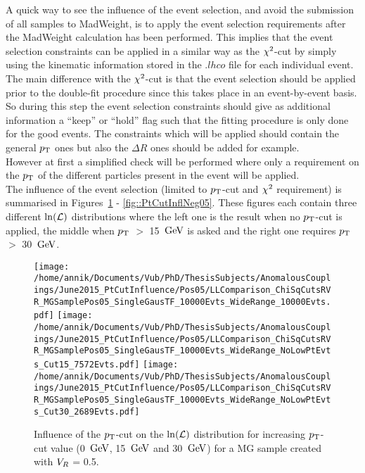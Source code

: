 A quick way to see the influence of the event selection, and avoid the submission of all samples to MadWeight, is to apply the event selection requirements after the MadWeight calculation has been performed. This implies that the event selection constraints can be applied in a similar way as the $\chi^{2}$-cut by simply using the kinematic information stored in the $.lhco$ file for each individual event. The main difference with the $\chi^{2}$-cut is that the event selection should be applied prior to the double-fit procedure since this takes place in an event-by-event basis. So during this step the event selection constraints should give as additional information a ``keep'' or ``hold'' flag such that the fitting procedure is only done for the good events. The constraints which will be applied should contain the general $p_{\textrm T}$ ones but also the $\Delta R$ ones should be added for example.
\\
However at first a simplified check will be performed where only a requirement on the $p_{\textrm T}$ of the different particles present in the event will be applied.
\\

The influence of the event selection (limited to $p_{\textrm T}$-cut and $\chi^{2}$ requirement) is summarised in Figures~\ref{fig::PtCutInflPos05} - \ref{fig::PtCutInflNeg05}.
These figures each contain three different $\ln(\mathcal{L})$ distributions where the left one is the result when no $p_{\textrm T}$-cut is applied, the middle when $p_{\textrm T}$ $>$ 15 $\, \mathrm{GeV}$ is asked and the right one requires $p_{\textrm T}$ $>$ 30 $\, \mathrm{GeV}$.

\begin{figure}[h!t]
 \centering
 \texttt{[image: /home/annik/Documents/Vub/PhD/ThesisSubjects/AnomalousCouplings/June2015\_PtCutInfluence/Pos05/LLComparison\_ChiSqCutsRVR\_MGSamplePos05\_SingleGausTF\_10000Evts\_WideRange\_10000Evts.pdf]}
 \texttt{[image: /home/annik/Documents/Vub/PhD/ThesisSubjects/AnomalousCouplings/June2015\_PtCutInfluence/Pos05/LLComparison\_ChiSqCutsRVR\_MGSamplePos05\_SingleGausTF\_10000Evts\_WideRange\_NoLowPtEvts\_Cut15\_7572Evts.pdf]}
 \texttt{[image: /home/annik/Documents/Vub/PhD/ThesisSubjects/AnomalousCouplings/June2015\_PtCutInfluence/Pos05/LLComparison\_ChiSqCutsRVR\_MGSamplePos05\_SingleGausTF\_10000Evts\_WideRange\_NoLowPtEvts\_Cut30\_2689Evts.pdf]}
 \caption{Influence of the $p_{\textrm T}$-cut on the $\ln(\mathcal{L})$ distribution for increasing $p_{\textrm T}$-cut value (0 $\, \mathrm{GeV}$, 15 $\, \mathrm{GeV}$ and 30 $\, \mathrm{GeV}$) for a MG sample created with $V_{R}$ = 0.5.}
 \label{fig::PtCutInflPos05}
\end{figure}

